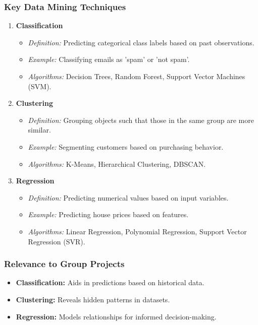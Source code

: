 \documentclass[aspectratio=169]{beamer}
\begin{document}
\begin{frame}[fragile]
    \frametitle{Key Data Mining Techniques}
    \begin{enumerate}
        \item \textbf{Classification}
            \begin{itemize}
                \item \textit{Definition:} Predicting categorical class labels based on past observations.
                \item \textit{Example:} Classifying emails as 'spam' or 'not spam'.
                \item \textit{Algorithms:} Decision Trees, Random Forest, Support Vector Machines (SVM).
            \end{itemize}
            
        \item \textbf{Clustering}
            \begin{itemize}
                \item \textit{Definition:} Grouping objects such that those in the same group are more similar.
                \item \textit{Example:} Segmenting customers based on purchasing behavior.
                \item \textit{Algorithms:} K-Means, Hierarchical Clustering, DBSCAN.
            \end{itemize}
            
        \item \textbf{Regression}
            \begin{itemize}
                \item \textit{Definition:} Predicting numerical values based on input variables.
                \item \textit{Example:} Predicting house prices based on features.
                \item \textit{Algorithms:} Linear Regression, Polynomial Regression, Support Vector Regression (SVR).
            \end{itemize}
    \end{enumerate}
\end{frame}

\begin{frame}[fragile]
    \frametitle{Relevance to Group Projects}
    \begin{itemize}
        \item \textbf{Classification:} Aids in predictions based on historical data.
        \item \textbf{Clustering:} Reveals hidden patterns in datasets.
        \item \textbf{Regression:} Models relationships for informed decision-making.
    \end{itemize}
\end{frame}
\end{document}
